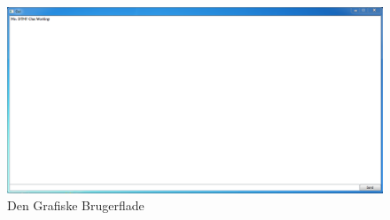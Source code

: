 \begin{figure}[h]
\centering
\includegraphics[scale=0.5]{Billeder/GUI.PNG}
\caption{Den Grafiske Brugerflade}
\label{fig:GUI}
\end{figure}
